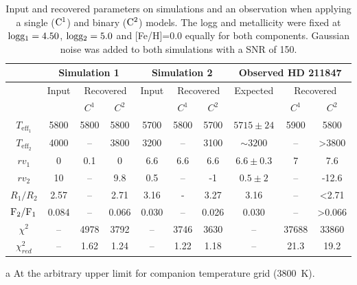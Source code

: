 
\begin{table*}
    \caption{Input and recovered parameters on simulations and an observation when applying a single (\(\rm C^1\)) and binary (\(\rm C^2\)) models. The logg and metallicity were fixed at \(\rm logg_1 = 4.50\), \(\rm logg_2=5.0\) and [Fe/H]=0.0 equally for both components. Gaussian noise was added to both simulations with a SNR of 150.}
    \centering
    \begin{tabular}{c | *3c | *3c | *3c}
        \toprule
        & \multicolumn{3}{c|}{Simulation 1} & \multicolumn{3}{c|}{Simulation 2} & \multicolumn{3}{c}{Observed {HD 211847}} \\
        \midrule
        & Input & \multicolumn{2}{c|}{Recovered} & Input & \multicolumn{2}{c|}{Recovered} & Expected & \multicolumn{2}{c}{Recovered} \\
        & & \(C^1\) & \(C^2\) & & \(C^1\) & \(C^2\) & & \(C^1\)  & \(C^2\) \\
        \midrule
        \(T_{\textrm{eff}_1}\) & 5800 & 5800 & 5800 & 5700 & 5800 & 5700 & \(5715 \pm 24\) & 5900 & 5800\\
        \(T_{\textrm{eff}_2}\) & 4000 & -- & 3800 & 3200 & -- & 3100 & \(\sim3200\) & -- & >3800\tnote{a}\\
        \({rv}_1\) & 0 & 0.1 & 0 & 6.6 & 6.6 & 6.6 & \(6.6 \pm 0.3\) & 7& 7.6 \\
        \({rv}_2\) &  10 & -- & 9.8 & 0.5 & -- &  -1& \(0.5 \pm 2\) & -- &-12.6\\
        \midrule
        \(R_1/R_2\)& 2.57 & -- & 2.71& 3.16 & - & 3.27 & 3.16 & -- & <2.71\tnote{a}\\
        \(\rm F_2/F_1\)& 0.084 & -- & 0.066 & 0.030 & -- & 0.026 & 0.030 & -- & >0.066\tnote{a}\\
        \(\chi^2\)& -- & 4978 & 3792 & -- & 3746 & 3630  & -- & 37688 & 33860\\
        \(\chi^2_{red}\) & -- & 1.62 & 1.24 & -- & 1.22 & 1.18 & -- & 21.3 & 19.2\\
        \bottomrule
    \end{tabular}
    \begin{tablenotes}
       \item [a] {At the arbitrary upper limit for companion temperature grid (3800~K).}
    \end{tablenotes}
    \label{tab:example_params}
\end{table*}
